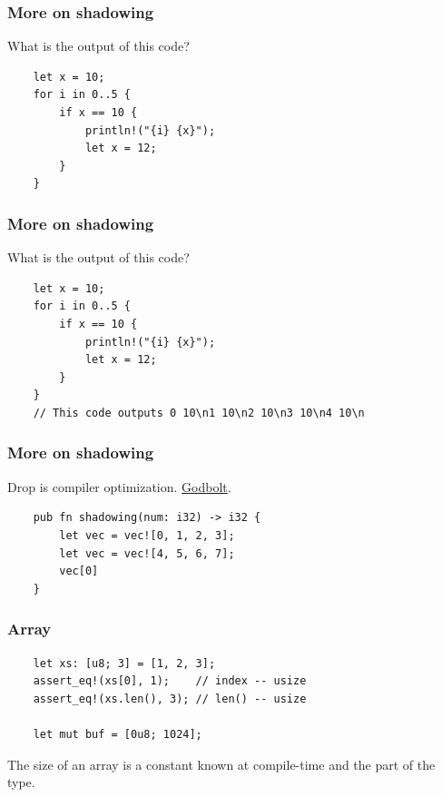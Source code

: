 \documentclass[aspectratio=1610,t]{beamer}
\begin{document}

\begin{frame}[fragile]
\frametitle{More on shadowing}
What is the output of this code?

\begin{verbatim}
    let x = 10;
    for i in 0..5 {
        if x == 10 {
            println!("{i} {x}");
            let x = 12;
        }
    }
\end{verbatim}
\end{frame}


\begin{frame}[fragile]
\frametitle{More on shadowing}
What is the output of this code?

\begin{verbatim}
    let x = 10;
    for i in 0..5 {
        if x == 10 {
            println!("{i} {x}");
            let x = 12;
        }
    }
    // This code outputs 0 10\n1 10\n2 10\n3 10\n4 10\n
\end{verbatim}
\end{frame}


\begin{frame}[fragile]
\frametitle{More on shadowing}
Drop is compiler optimization. \href{https://rust.godbolt.org/z/3b5hfr7db}{Godbolt}.

\begin{verbatim}
    pub fn shadowing(num: i32) -> i32 {
        let vec = vec![0, 1, 2, 3];
        let vec = vec![4, 5, 6, 7];
        vec[0]
    }
\end{verbatim}
\end{frame}


\begin{frame}[fragile]
\frametitle{Array}
\begin{verbatim}
    let xs: [u8; 3] = [1, 2, 3];
    assert_eq!(xs[0], 1);    // index -- usize
    assert_eq!(xs.len(), 3); // len() -- usize

    let mut buf = [0u8; 1024];
\end{verbatim}

The size of an array is a constant known at compile-time and the part of the type.
\end{frame}
\end{document}
